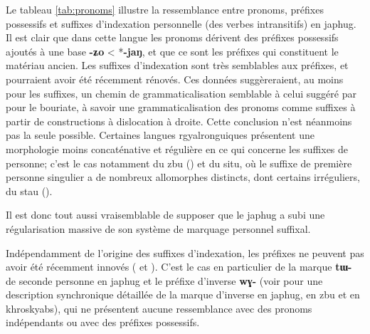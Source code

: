 \documentclass[oldfontcommands,oneside,a4paper,11pt]{article}
\newcommand{\ipa}[1]{{\phon\textbf{\mbox{#1}}}} %
\begin{document}
Le tableau \ref{tab:pronoms} illustre la ressemblance entre pronoms, préfixes possessifs et suffixes d'indexation personnelle (des verbes intransitifs) en japhug. Il est clair que dans cette langue les pronoms dérivent des préfixes possessifs ajoutés à une base \ipa{-ʑo} < *\ipa{-jaŋ}, et que ce sont les préfixes qui constituent le matériau ancien. Les suffixes d'indexation sont très semblables aux préfixes, et pourraient avoir été récemment rénovés. Ces données suggèreraient, au moins pour les suffixes, un chemin de grammaticalisation semblable à celui  suggéré par \citet{comrie80morpho} pour le bouriate, à savoir une grammaticalisation des pronoms comme suffixes à partir de constructions à dislocation à droite. Cette conclusion n'est néanmoins pas la seule possible. Certaines langues rgyalronguiques présentent une morphologie moins concaténative et régulière en ce qui concerne les suffixes de personne; c'est le cas notamment du zbu (\citealt{gongxun14agreement}) et du situ, où le suffixe de première personne singulier a de nombreux allomorphes distincts, dont certains irréguliers, du stau (\citealt{jacques14rtau}). 

Il est donc tout aussi vraisemblable de supposer que le japhug a subi une régularisation massive de son système de marquage personnel suffixal.
   
   Indépendamment de l'origine des suffixes d'indexation,  les préfixes ne peuvent pas avoir été récemment innovés (\citealt{jacques12agreement} et \citealt{delancey14second}). C'est le cas en particulier de la marque \ipa{tɯ-} de seconde personne en japhug et le préfixe d'inverse \ipa{wɣ-} (voir \citealt{jacques10inverse, gongxun14agreement, lai15person} pour une description synchronique détaillée de la marque d'inverse en japhug, en zbu et en khroskyabs), qui ne présentent aucune ressemblance avec des pronoms indépendants ou avec des préfixes possessifs.
   
\end{document}
